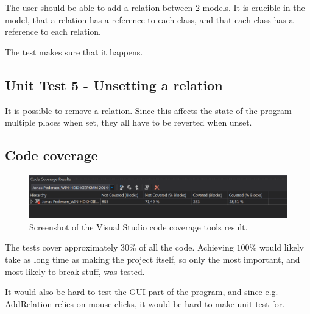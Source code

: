 The user should be able to add a relation between 2 models. It is crucible in
the model, that a relation has a reference to each class, and that each class has
a reference to each relation.

The test makes sure that it happens.

\subsection{Unit Test 5 - Unsetting a relation}

It is possible to remove a relation. Since this affects the state of the program
multiple places when set, they all have to be reverted when unset.


\subsection{Code coverage}

\begin{figure}
\centering
\includegraphics[width=0.85\linewidth]{img/coverage}
\caption{Screenshot of the Visual Studio code coverage tools result.}
\end{figure}

The tests cover approximately $30\%$ of all the code. Achieving $100\%$ would
likely take as long time as making the project itself, so only the most
important, and most likely to break stuff, was tested.

It would also be hard to test the GUI part of the program, and since e.g.
AddRelation relies on mouse clicks, it would be hard to make unit test for.
